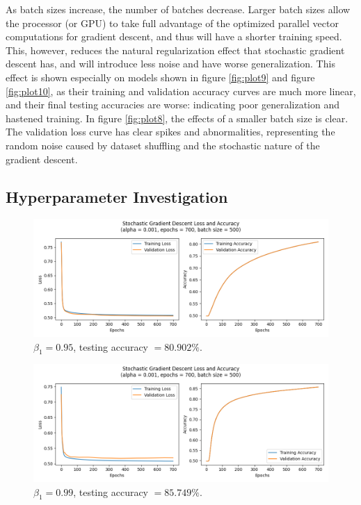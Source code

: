 \documentclass[letter]{article}
\begin{document}
As batch sizes increase, the number of batches decrease. Larger batch sizes allow the processor (or GPU) to take full advantage of the optimized parallel vector computations for gradient descent, and thus will have a shorter training speed. This, however, reduces the natural regularization effect that stochastic gradient descent has, and will introduce less noise and have worse generalization. This effect is shown especially on models shown in figure \ref{fig:plot9} and figure \ref{fig:plot10}, as their training and validation accuracy curves are much more linear, and their final testing accuracies are worse: indicating poor generalization and hastened training. In figure \ref{fig:plot8}, the effects of a smaller batch size is clear. The validation loss curve has clear spikes and abnormalities, representing the random noise caused by dataset shuffling and the stochastic nature of the gradient descent. 

\newpage

\subsection{Hyperparameter Investigation}

\begin{figure}[H]
	\centering
	\includegraphics[width=\linewidth]{Figure_11}
	\caption{$\beta_1 = 0.95$, testing accuracy $ = 80.902\%$.}
	\label{fig:plot11}
\end{figure}

\begin{figure}[H]
	\centering
	\includegraphics[width=\linewidth]{Figure_12}
	\caption{$\beta_1 = 0.99$, testing accuracy $ = 85.749\%$.}
	\label{fig:plot12}
\end{figure}
\end{document}

